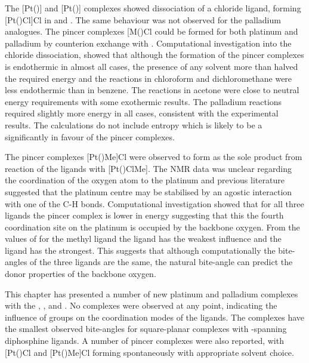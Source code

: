The [Pt(\tBuxantphos)] and [Pt(\tButhixantphos)] complexes showed dissociation of a chloride ligand, forming [Pt(\tBuxantphosk)Cl]Cl in  and .  The same behaviour was not observed for the palladium analogues.  The pincer complexes [M(\tBuxantphosk)Cl\ce{]+} could be formed for both platinum and palladium by counterion exchange with .  Computational investigation into the chloride dissociation, showed that although the formation of the pincer complexes is endothermic in almost all cases, the presence of any solvent more than halved the required energy  and the reactions in chloroform and dichloromethane were less endothermic than in benzene.  The reactions in acetone were close to neutral energy requirements with some exothermic results.  The palladium reactions required slightly more energy in all cases, consistent with the experimental results.  The calculations do not include entropy which is likely to be a significantly in favour of the pincer complexes.    

The pincer complexes [Pt(\tBuxantphosk)Me]Cl were observed to form as the sole product from reaction of the \tBuxantphos{} ligands with [Pt()ClMe].  The NMR data was unclear regarding the coordination of the oxygen atom to the platinum and previous literature suggested that the platinum centre may be stabilised by an agostic interaction with one of the \tBu{} C-H bonds.  Computational investigation showed that for all three \tBuxantphos{} ligands the pincer complex is lower in energy suggesting that this the fourth coordination site on the platinum is occupied by the backbone oxygen.  From the values of \JPC{} for the methyl ligand the \tBusixantphos{} ligand has the weakest \trans{} influence and the \tBuxantphos{} ligand has the strongest.  This suggests that although computationally the bite-angles of the three ligands are the same, the natural bite-angle can predict the donor properties of the backbone oxygen.  

This chapter has presented a number of new platinum and palladium complexes with the \tBusixantphos{}, \tButhixantphos{}, and \tBuxantphos{}.  No \cis{} complexes were observed at any point, indicating the influence of \tBu{} groups on the coordination modes of the ligands.  The \trans{} complexes have the smallest observed bite-angles for square-planar complexes with \trans{}-spanning diphosphine ligands.  A number of \tBuxantphos{} pincer complexes were also reported, with [Pt(\tBuxantphos)Cl\ce{]+} and [Pt(\tBuxantphos)Me]Cl forming spontaneously with appropriate solvent choice. 	
	
	
	
	
	
	
	
	
	
	
	
	
	
	
	
	
	
	
	



